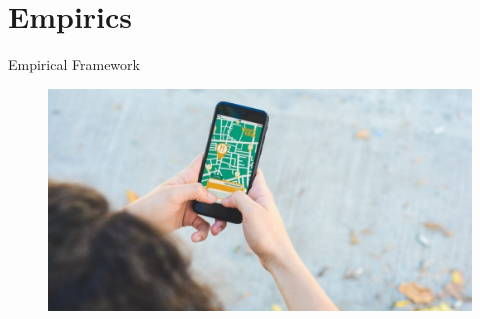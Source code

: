 \documentclass[aspectratio=169]{beamer}
\begin{document}
\section{Empirics}

\begin{frame}[noframenumbering]
\Huge{\centerline{Empirical Framework}}

\vspace{5mm}

\begin{figure}[H]
\includegraphics[scale=0.35]{Figures/TripAdvisor-1024x536.jpeg} 
\end{figure}
\end{frame}
\end{document}
